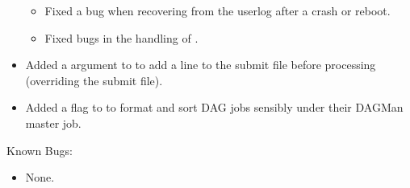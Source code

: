 \begin{itemize}
\begin{itemize}
\item
Fixed a bug when recovering from the userlog after a crash or reboot.

\item
Fixed bugs in the handling of .

\end{itemize}

\item
Added a  argument to  to add a line to the
submit file before processing (overriding the submit file).

\item
Added a  flag to  to format and sort DAG jobs
sensibly under their DAGMan master job.

\end{itemize}

\noindent Known Bugs:

\begin{itemize}

\item None.

\end{itemize}
